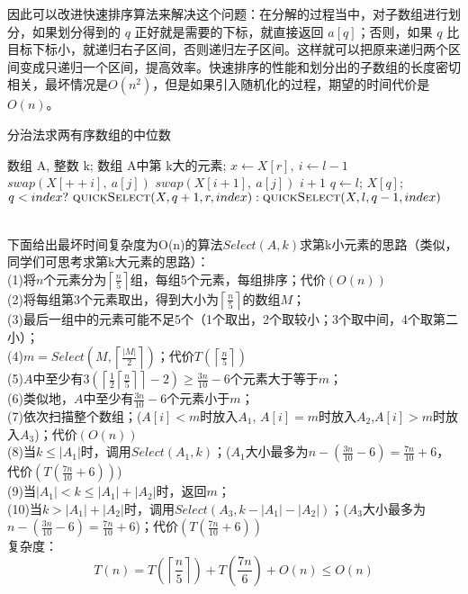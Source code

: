 \documentclass[UTF8,16pt]{article} %
\begin{document}
因此可以改进快速排序算法来解决这个问题：在分解的过程当中，对子数组进行划分，如果划分得到的 $q$ 正好就是需要的下标，就直接返回 $a[q]$；否则，如果 $q$ 比目标下标小，就递归右子区间，否则递归左子区间。这样就可以把原来递归两个区间变成只递归一个区间，提高效率。快速排序的性能和划分出的子数组的长度密切相关，最坏情况是$O(n^2)$，但是如果引入随机化的过程，期望的时间代价是$O(n)$。\\
{}
\begin{algorithm}
	\caption{分治法求两有序数组的中位数}  
	\label{alg:Framwork}  
	
	\begin{algorithmic}[1]  
		\Require  
		数组 A, 整数 k;    
		\Ensure  
		数组 A中第 k大的元素;  
		\State $x \gets X[r],~i \gets l-1$
		\State $swap(X[++i],~a[j])$
		\EndIf
		\EndFor
		\State $swap(X[i+1],~a[j])$
		\State \Return $i+1$
		\EndFunction
		\State $q \gets l$;
		\State \Return $X[q]$;
		\Else
		\State \Return $q < index?~ \Call{quickSelect}{X, q+1, r, index} : \Call{quickSelect}{X, l, q-1, index}$
		\EndIf
		\EndFunction
	\end{algorithmic}  
\end{algorithm}
\\
下面给出最坏时间复杂度为O(n)的算法$Select(A,k)$求第k小元素的思路（类似，同学们可思考求第k大元素的思路）：\\
(1)将$n$个元素分为$\left \lceil \frac{n}{5}\right \rceil$组，每组5个元素，每组排序；{\color{red}代价$(O(n))$}\\
(2)将每组第3个元素取出，得到大小为$\left \lceil \frac{n}{5}\right \rceil$的数组$M$；\\
(3)最后一组中的元素可能不足5个（1个取出，2个取较小；3个取中间，4个取第二小）；\\
(4)$m=Select(M, \left \lceil \frac{\left | M\right |}{2}\right \rceil)$；{\color{red}代价$T(\left \lceil \frac{n}{5}\right \rceil)$}\\
(5)$A$中至少有$3(\left \lceil \frac{1}{2}\left \lceil \frac{n}{5}\right \rceil\right \rceil-2) \geq \frac{3n}{10}-6$个元素大于等于$m$；\\
(6)类似地，$A$中至少有$\frac{3n}{10}-6$个元素小于$m$；\\
(7)依次扫描整个数组；($A[i]<m$时放入$A_{1}$, $A[i]=m$时放入$A_{2}$,$A[i]>m$时放入$A_{3}$)；{\color{red}代价$(O(n))$}\\
(8)当$k\leq |A_1|$时，调用$Select(A_1,k)$；($A_1$大小最多为$n-(\frac{3n}{10}-6)=\frac{7n}{10}+6$，{\color{red}代价$(T(\frac{7n}{10}+6))$})\\
(9)当$|A_1|< k \leq |A_1|+|A_2|$时，返回$m$；\\
(10)当$k>|A_1|+|A_2|$时，调用$Select(A_3, k-|A_1|-|A_2|)$；($A_3$大小最多为$n-(\frac{3n}{10}-6) = \frac{7n}{10}+6$)；{\color{red}代价$(T(\frac{7n}{10}+6))$}\\
复杂度：$$T(n)=T(\left \lceil \frac{n}{5}\right \rceil)+T(\frac{7n}{6})+O(n)\leq O(n)$$
\end{document}
